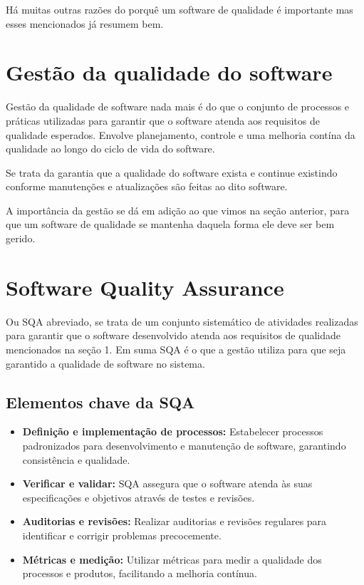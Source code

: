 \documentclass{article}
\begin{document}
Há muitas outras razões do porquê um software de qualidade
é importante mas esses mencionados já resumem bem.


\section{Gestão da qualidade do software}

Gestão da qualidade de software nada mais é do que
o conjunto de processos e práticas utilizadas para 
garantir que o software atenda aos requisitos de qualidade
esperados. Envolve planejamento, controle e uma melhoria
contína da qualidade ao longo do ciclo de vida do software.

Se trata da garantia que a qualidade do software exista
e continue existindo conforme manutenções e atualizações
são feitas ao dito software.

A importância da gestão se dá em adição ao que vimos
na seção anterior, para que um software de qualidade
se mantenha daquela forma ele deve ser bem gerido.

\section{Software Quality Assurance}
Ou SQA abreviado, se trata de um conjunto
sistemático de atividades realizadas para garantir
que o software desenvolvido atenda aos requisitos de qualidade mencionados
na seção 1. Em suma SQA é o que a gestão utiliza para que seja garantido 
a qualidade de software no sistema.


\newpage
\subsection*{Elementos chave da SQA}

\begin{itemize}
    \item \textbf{Definição e implementação de processos:} Estabelecer
    processos padronizados para desenvolvimento e manutenção de software,
    garantindo consistência e qualidade.
    \item \textbf{Verificar e validar:} SQA assegura que o software atenda às suas especificações
    e objetivos através de testes e revisões.
    \item \textbf{Auditorias e revisões:} Realizar auditorias e revisões
    regulares para identificar e corrigir problemas precocemente.
    \item \textbf{Métricas e medição:} Utilizar métricas para medir a qualidade
    dos processos e produtos, facilitando a melhoria contínua.
\end{itemize}
\end{document}

